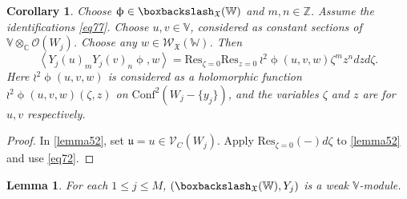 \documentclass[11pt,b5paper,notitlepage]{article}
\theoremstyle{definition}
\theoremstyle{plain}
\newtheorem{co}[df]{Corollary}
\newtheorem{lm}[df]{Lemma}
\newcommand{\fk}{\mathfrak}
\newcommand{\mc}{\mathcal}
\newcommand{\Conf}{\mathrm{Conf}}
\newcommand{\Res}{\mathrm{Res}}
\newcommand{\scr}{\mathscr}
\newcommand{\Vbb}{\mathbb V}
\newcommand{\Wbb}{\mathbb W}
\newcommand{\Cbb}{\mathbb C}
\newcommand{\Zbb}{\mathbb Z}
\newcommand{\<}{\left\langle}
\renewcommand{\>}{\right\rangle}
\newcommand{\fx}{\mathfrak{X}}
\numberwithin{equation}{subsection}
\begin{document}
\begin{co}\label{lb22}
Choose $\upphi\in \boxbackslash_{\fx}(\Wbb)$ and $m,n\in \Zbb$. Assume the identifications \eqref{eq77}. Choose $u,v\in \Vbb$, considered as constant sections of $\Vbb\otimes_\Cbb\mc O(W_j)$. Choose any $w\in \scr W_{\fk X}(\Wbb)$. Then
    \begin{equation}\label{lemma51}
        \<Y_j(u)_mY_j(v)_n\upphi,w\>=\Res_{\zeta=0}\Res_{z=0}~{\wr^2\upphi}(u,v,w)\zeta^mz^n dzd\zeta.
    \end{equation}
    Here $\wr^2\upphi(u,v,w)$ is considered as a holomorphic function $\wr^2\upphi(u,v,w)(\zeta,z)$ on $\Conf^2(W_j-\{y_j\})$, and the variables $\zeta$ and $z$ are for $u,v$ respectively.
\end{co}


\begin{proof}
In \eqref{lemma52}, set $\fk u=u\in\scr V_C(W_j)$. Apply $\Res_{\zeta=0}(-)d\zeta$ to \eqref{lemma52} and use \eqref{eq72}.
\end{proof}


\begin{lm}\label{lb21}
For each $1\leq j\leq M$,    $(\boxbackslash_{\fx}(\Wbb),Y_j)$ is a weak $\Vbb$-module.
\end{lm}
\end{document}
